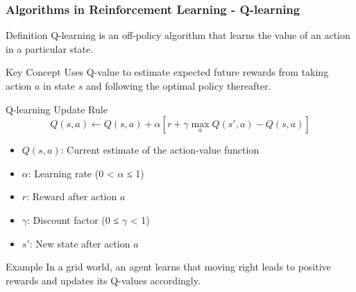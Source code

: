 \documentclass[aspectratio=169]{beamer}
\begin{document}
\begin{frame}[fragile]
    \frametitle{Algorithms in Reinforcement Learning - Q-learning}
    \begin{block}{Definition}
        Q-learning is an off-policy algorithm that learns the value of an action in a particular state.
    \end{block}
    
    \begin{block}{Key Concept}
        Uses Q-value to estimate expected future rewards from taking action \( a \) in state \( s \) and following the optimal policy thereafter.
    \end{block}
    
    \begin{block}{Q-learning Update Rule}
        \begin{equation}
            Q(s, a) \leftarrow Q(s, a) + \alpha \left[ r + \gamma \max_a Q(s', a) - Q(s, a) \right]
        \end{equation}
        \begin{itemize}
            \item \( Q(s, a) \): Current estimate of the action-value function
            \item \( \alpha \): Learning rate (0 < \( \alpha \) ≤ 1)
            \item \( r \): Reward after action \( a \)
            \item \( \gamma \): Discount factor (0 ≤ \( \gamma \) < 1)
            \item \( s' \): New state after action \( a \)
        \end{itemize}
    \end{block}
    
    \begin{block}{Example}
        In a grid world, an agent learns that moving right leads to positive rewards and updates its Q-values accordingly.
    \end{block}
\end{frame}
\end{document}

